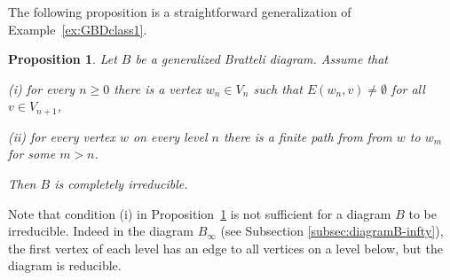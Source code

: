 \documentclass[11pt, twoside]{amsart}
\theoremstyle{definition}
\theoremstyle{remark}
\theoremstyle{plain}
\newtheorem{prop}[definition]{Proposition}
\numberwithin{equation}{section}
\begin{document}



The following proposition is a straightforward generalization of Example~\ref{ex:GBDclass1}. 

\begin{prop}\label{Prop:suff_cond_irred_isom}
    Let $B$ be a generalized Bratteli diagram. Assume that
    
    (i) for every $n \geq 0$ there is a vertex $w_n \in V_n$ such that $E(w_n,v) \neq \emptyset$ for all $v \in V_{n+1}$,

    (ii) for every vertex $w$ on every level $n$ there is a finite path from from $w$ to $w_m$ for some $m > n$.

    Then $B$ is completely irreducible.
\end{prop}

Note that condition (i) in Proposition~\ref{Prop:suff_cond_irred_isom} is not sufficient for a diagram $B$ to be irreducible. Indeed in the diagram $B_{\infty}$ (see Subsection \ref{subsec:diagramB-infty}), the first vertex of each level has an edge to all vertices on a level below, but the diagram is reducible.
\end{document}
